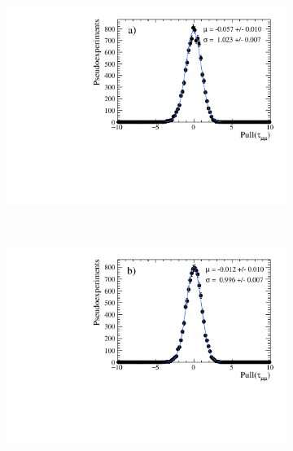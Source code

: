{\begin{figure}[tbp]
    \centering
   \begin{subfigure}[b]{0.48\textwidth}
        \includegraphics[width= \textwidth]{./Figs/LifetimeMeasurement/50fb_simple_tau_pull.pdf}
    \end{subfigure}
   ~ %
    \begin{subfigure}[b]{0.48\textwidth}
       \includegraphics[width=\textwidth]{./Figs/LifetimeMeasurement/300fb_simple_tau_pull.pdf}

\end{subfigure}
\end{figure}}
